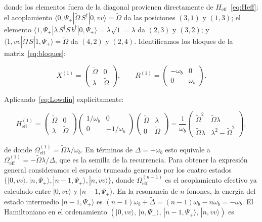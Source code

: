 donde los elementos fuera de la diagonal provienen directamente de $H_\mathrm{eff}$~\eqref{eq:Heff}: el acoplamiento $\langle 0,\Psi_+|\widetilde\Omega\,S^\dagger|0,vv\rangle = \widetilde\Omega$ da las posiciones $(3,1)$ y $(1,3)$; el elemento $\langle 1,\Psi_+|\lambda\,S^\dagger S\,b^\dagger|0,\Psi_+\rangle = \lambda\sqrt{1} = \lambda$ da $(2,3)$ y $(3,2)$; y $\langle 1,vv|\widetilde\Omega\,S|1,\Psi_+\rangle = \widetilde\Omega$
da $(4,2)$ y $(2,4)$. Identificamos los bloques de la matriz~\eqref{eq:bloques}:

\begin{equation}
	X^{(1)} = \begin{pmatrix}
		\widetilde\Omega & 0 \\[4pt] \lambda & \widetilde\Omega
	\end{pmatrix},
	\qquad
	R^{(1)} = \begin{pmatrix}
		-\omega_b & 0 \\[4pt] 0 & \omega_b
	\end{pmatrix}.
	\label{eq:bloques1}
\end{equation}

Aplicando~\eqref{eq:Lowdin} explícitamente:

\begin{equation}
	H_\mathrm{eff}^{(1)}
	= \begin{pmatrix}\widetilde\Omega & 0\\\lambda & \widetilde\Omega\end{pmatrix}
	\begin{pmatrix}1/\omega_b & 0\\ 0 & -1/\omega_b\end{pmatrix}
	\begin{pmatrix}\widetilde\Omega & \lambda\\ 0 & \widetilde\Omega\end{pmatrix}
	= \frac{1}{\omega_b}\begin{pmatrix}
		\widetilde\Omega^2 & \widetilde\Omega\lambda \\[4pt]
		\widetilde\Omega\lambda & \lambda^2 - \widetilde\Omega^2
	\end{pmatrix},
	\label{eq:Heff1}
\end{equation}

de donde $\Omega_\mathrm{eff}^{(1)} = \widetilde\Omega\lambda/\omega_b$. En términos de $\Delta = -\omega_b$ esto equivale a $\Omega_\mathrm{eff}^{(1)} = -\widetilde\Omega\lambda/\Delta$, que es la semilla de la recurrencia. Para obtener la expresión general consideramos el espacio truncado generado por los cuatro estados $\{|0,vv\rangle, |n,\Psi_+\rangle, |n-1,\Psi_+\rangle, |n,vv\rangle\}$, donde $\Omega_\mathrm{eff}^{(n-1)}$ es el acoplamiento efectivo ya calculado entre $|0,vv\rangle$ y $|n-1,\Psi_+\rangle$. En la resonancia de $n$ fonones, la energía del estado intermedio $|n-1,\Psi_+\rangle$ es $(n-1)\omega_b + \widetilde\Delta = (n-1)\omega_b - n\omega_b = -\omega_b$. El Hamiltoniano en el ordenamiento $(|0,vv\rangle,\,|n,\Psi_+\rangle,\,|n-1,\Psi_+\rangle,\,|n,vv\rangle)$ es

